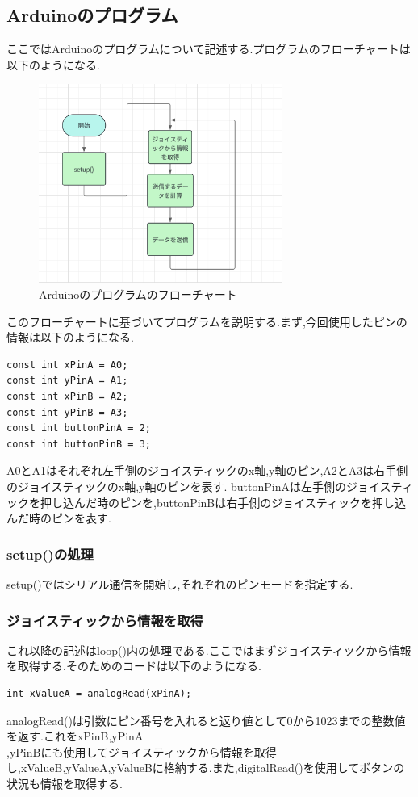 \documentclass[dvipdfmx]{jarticle}
\begin{document}
\subsection{Arduinoのプログラム}
ここではArduinoのプログラムについて記述する.プログラムのフローチャートは以下のようになる.\cite{2}
\begin{figure}[h]
    \centering
    \includegraphics[width=8cm]{arduino_huroty.png}
    \caption{Arduinoのプログラムのフローチャート}
\end{figure}
このフローチャートに基づいてプログラムを説明する.まず,今回使用したピンの情報は以下のようになる.
\begin{lstlisting}
const int xPinA = A0;
const int yPinA = A1;
const int xPinB = A2;
const int yPinB = A3;
const int buttonPinA = 2;
const int buttonPinB = 3;
\end{lstlisting}
A0とA1はそれぞれ左手側のジョイスティックのx軸,y軸のピン,A2とA3は右手側のジョイスティックのx軸,y軸のピンを表す.
buttonPinAは左手側のジョイスティックを押し込んだ時のピンを,buttonPinBは右手側のジョイスティックを押し込んだ時のピンを表す.
\subsubsection{setup()の処理}
setup()ではシリアル通信を開始し,それぞれのピンモードを指定する.
\subsubsection{ジョイスティックから情報を取得}
これ以降の記述はloop()内の処理である.ここではまずジョイスティックから情報を取得する.そのためのコードは以下のようになる.
\begin{lstlisting}
int xValueA = analogRead(xPinA);
\end{lstlisting}
analogRead()は引数にピン番号を入れると返り値として0から1023までの整数値を返す.これをxPinB,yPinA\\
,yPinBにも使用してジョイスティックから情報を取得し,xValueB,yValueA,yValueBに格納する.また,digitalRead()を使用してボタンの状況も情報を取得する.
\end{document}
